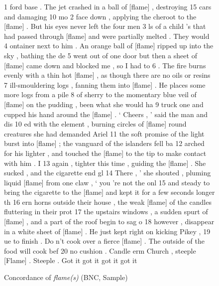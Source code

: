\begin{figure}
\caption{Concordance of \textit{flame(s)} (BNC, Sample)}
\label{fig:flameconc}
\hrulefill
\begin{fitverb}
 1 ford base . The jet crashed in a ball of [flame] , destroying 15 cars and damaging 10 mo
 2  face down , applying the cheroot to the [flame] . But his eyes never left the four men
 3 ls of a child 's that had passed through [flame] and were partially melted . They would
 4 ontainer next to him . An orange ball of [flame] ripped up into the sky , bathing the de
 5 went out of one door but then a sheet of [flame] came down and blocked me , so I had to
 6  . The fire burns evenly with a thin hot [flame] , as though there are no oils or resins
 7 ill-smouldering logs , fanning them into [flame] . He places some more logs from a pile
 8  of sherry to the momentary blue veil of [flame] on the pudding , been what she would ha
 9 truck one and cupped his hand around the [flame] . ` Cheers , ' said the man and dis
10 ed with the element , burning circles of [flame] round creatures she had demanded Ariel
11 the soft promise of the light burst into [flame] ; the vanguard of the islanders fell ba
12 arched for his lighter , and touched the [flame] to the tip to make contact with him . I
13  again , tighter this time , guiding the [flame] . She sucked , and the cigarette end gl
14   There , ' she shouted , pluming liquid [flame] from one claw , ` you 're not the onl
15 and steady to bring the cigarette to the [flame] and kept it for a few seconds longer th
16 ern horns outside their house , the weak [flame] of the candles fluttering in their prot
17 the upstairs windows , a sudden spurt of [flame] , and a part of the roof begin to sag o
18  however , disappear in a white sheet of [flame] . He just kept right on kicking Pikey ,
19 ue to finish . Do n't cook over a fierce [flame] . The outside of the food will cook bef
20 no cushion . Candle erm Church , steeple [Flame] . Steeple . Got it got it got it got it


\end{fitverb}
\end{figure}
